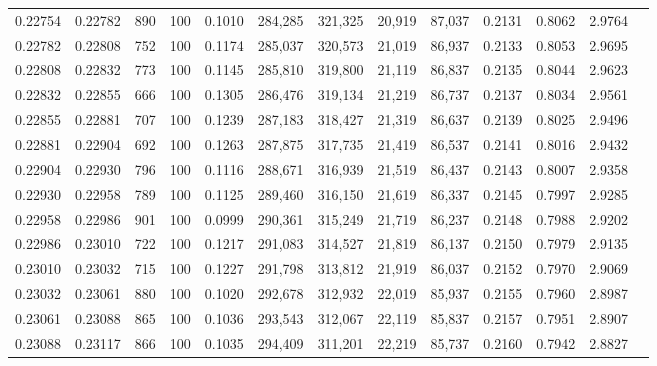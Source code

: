 \begin{tabular}{rrrrrrrrrrrrr}
0.22754 & 0.22782 &   890 & 100 &                                     0.1010 & 284,285 & 321,325 &  20,919 &  87,037 & 0.2131 & 0.8062 & 2.9764 \\
0.22782 & 0.22808 &   752 & 100 &                                     0.1174 & 285,037 & 320,573 &  21,019 &  86,937 & 0.2133 & 0.8053 & 2.9695 \\
0.22808 & 0.22832 &   773 & 100 &                                     0.1145 & 285,810 & 319,800 &  21,119 &  86,837 & 0.2135 & 0.8044 & 2.9623 \\
0.22832 & 0.22855 &   666 & 100 &                                     0.1305 & 286,476 & 319,134 &  21,219 &  86,737 & 0.2137 & 0.8034 & 2.9561 \\
0.22855 & 0.22881 &   707 & 100 &                                     0.1239 & 287,183 & 318,427 &  21,319 &  86,637 & 0.2139 & 0.8025 & 2.9496 \\
0.22881 & 0.22904 &   692 & 100 &                                     0.1263 & 287,875 & 317,735 &  21,419 &  86,537 & 0.2141 & 0.8016 & 2.9432 \\
0.22904 & 0.22930 &   796 & 100 &                                     0.1116 & 288,671 & 316,939 &  21,519 &  86,437 & 0.2143 & 0.8007 & 2.9358 \\
0.22930 & 0.22958 &   789 & 100 &                                     0.1125 & 289,460 & 316,150 &  21,619 &  86,337 & 0.2145 & 0.7997 & 2.9285 \\
0.22958 & 0.22986 &   901 & 100 &                                     0.0999 & 290,361 & 315,249 &  21,719 &  86,237 & 0.2148 & 0.7988 & 2.9202 \\
0.22986 & 0.23010 &   722 & 100 &                                     0.1217 & 291,083 & 314,527 &  21,819 &  86,137 & 0.2150 & 0.7979 & 2.9135 \\
0.23010 & 0.23032 &   715 & 100 &                                     0.1227 & 291,798 & 313,812 &  21,919 &  86,037 & 0.2152 & 0.7970 & 2.9069 \\
0.23032 & 0.23061 &   880 & 100 &                                     0.1020 & 292,678 & 312,932 &  22,019 &  85,937 & 0.2155 & 0.7960 & 2.8987 \\
0.23061 & 0.23088 &   865 & 100 &                                     0.1036 & 293,543 & 312,067 &  22,119 &  85,837 & 0.2157 & 0.7951 & 2.8907 \\
0.23088 & 0.23117 &   866 & 100 &                                     0.1035 & 294,409 & 311,201 &  22,219 &  85,737 & 0.2160 & 0.7942 & 2.8827 \\

\end{tabular}
